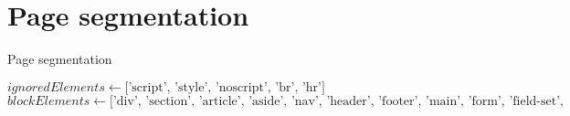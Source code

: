 \chapter{Page segmentation}
\label{appendix:pseudocode}

\begin{algorithm}
    \caption{Page segmentation}
    \begin{algorithmic}[1]
        \State $ignoredElements \gets \textrm{['script', 'style', 'noscript', 'br', 'hr']}$
        \State $blockElements \gets \textrm{['div', 'section', 'article', 'aside', 'nav', 'header', 'footer', 'main', 'form', 'field-set', 'table']}$

        \EndFunction
    \end{algorithmic}
\end{algorithm}